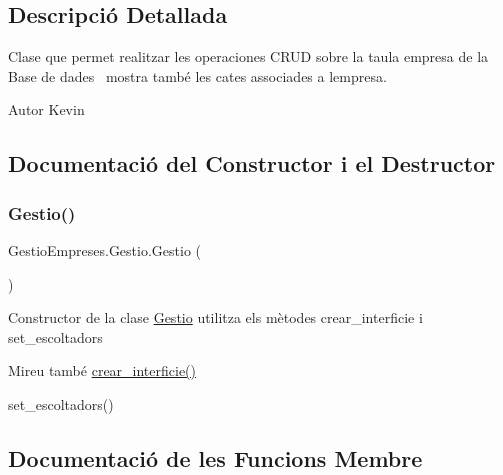 \subsection{Descripció Detallada}
Clase que permet realitzar les operaciones C\+R\+UD sobre la taula empresa de la Base de dades~\newline
 mostra també les cates associades a l\textquotesingle{}empresa. 

\begin{DoxyAuthor}{Autor}
Kevin 
\end{DoxyAuthor}


\subsection{Documentació del Constructor i el Destructor}
\mbox{\label{class_gestio_empreses_1_1_gestio_a91ba56ea47931cbd57490803f1d4fe9a}} 
\subsubsection{\texorpdfstring{Gestio()}{Gestio()}}
{\footnotesize\ttfamily Gestio\+Empreses.\+Gestio.\+Gestio (\begin{DoxyParamCaption}{ }\end{DoxyParamCaption})}

Constructor de la clase \mbox{\hyperlink{class_gestio_empreses_1_1_gestio}{Gestio}} utilitza els mètodes crear\+\_\+interficie i set\+\_\+escoltadors \begin{DoxySeeAlso}{Mireu també}
\mbox{\hyperlink{class_gestio_empreses_1_1_gestio_a7e8574e7ebd38ba4e7ad4dc5076c4754}{crear\+\_\+interficie()}} 

set\+\_\+escoltadors() 
\end{DoxySeeAlso}


\subsection{Documentació de les Funcions Membre}
\mbox{\label{class_gestio_empreses_1_1_gestio_a7e8574e7ebd38ba4e7ad4dc5076c4754}} 

